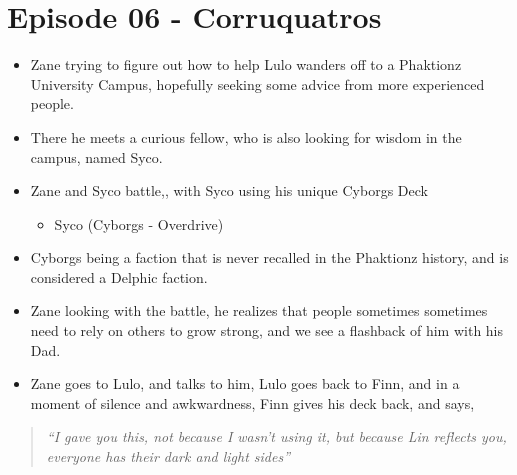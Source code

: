 \documentclass[12pt, letterpaper]{article}
\begin{document}
\section*{Episode 06 - Corruquatros}

\begin{itemize}
    \item Zane trying to figure out how to help Lulo wanders off to a Phaktionz University Campus, hopefully seeking some advice from more experienced people.
    \item There he meets a curious fellow, who is also looking for wisdom in the campus, named Syco.
    \item Zane and Syco battle,, with Syco using his unique Cyborgs Deck
    \begin{itemize}
        \item  Syco (Cyborgs - Overdrive)
    \end{itemize}
    \item Cyborgs being a faction that is never recalled in the Phaktionz history, and is considered a Delphic faction.
    \item Zane looking with the battle, he realizes that people sometimes sometimes need to rely on others to grow strong, and we see a flashback of him with his Dad.
    \item Zane goes to Lulo, and talks to him, Lulo goes back to Finn, and in a moment of silence and awkwardness, Finn gives his deck back, and says,
\end{itemize}
\begin{quotation}
   \textit{ “I gave you this, not because I wasn’t using it, but because Lin reflects you, everyone has their dark and light sides”}
\end{quotation}


   
\end{document}
